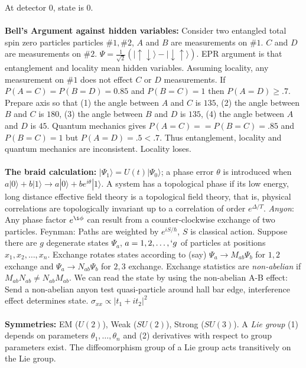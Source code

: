 At detector 0, state is $0$.
\\
\\
{\bf Bell's Argument against hidden variables:}
Consider two entangled total spin zero particles particles $\# 1, \#2$, 
$A$ and $B$ are measurements on $\#1$.
$C$ and $D$ are measurements on $\#2$.
$\Psi= {\frac 1 {\sqrt 2}} ( |\uparrow \downarrow\rangle - | \downarrow \uparrow\rangle )$.
EPR argument is that entanglement and locality mean hidden variables.  Assuming
locality, any measurement on $\#1$ does not effect $C$ or $D$ measurements.
If $P(A=C)=P(B=D)= 0.85$ and $P(B=C)=1$ then $P(A=D) \ge .7$.
Prepare axis so that 
(1) the angle between $A$ and $C$ is $135$,
(2) the angle between $B$ and $C$ is $180$,
(3) the angle between $B$ and $D$ is $135$,
(4) the angle between $A$ and $D$ is $45$.  Quantum mechanics gives
$P(A=C)= =P(B=C)= .85$ and $P(B=C)=1$ but $P(A=D)= .5 < .7$.  Thus entanglement, locality
and quantum mechanics are inconsistent.  Locality loses.
\\
\\
{\bf The braid calculation:}
$|\Psi_1 \rangle= U(t) |\Psi_0 \rangle$; a phase error $\theta$ is introduced when
$a |0 \rangle + b |1 \rangle \rightarrow a |0 \rangle + b e^{i \theta} |1 \rangle$.  
A system has a topological phase if its
low energy, long distance effective field theory is a topological field theory, 
that is, physical
correlations are topologically invariant up to a correlation of order $e^{\Delta/T}$.
\emph {Anyon}: Any phase factor $e^{\i \phi}$ can result from a counter-clockwise exchange
of two particles.  Feynman: Paths are weighted by $e^{i S/\hbar}$, $S$ is classical action.
Suppose there are $g$ degenerate states $\Psi_a$, $a= 1, 2, \ldots,`g$ of particles
at positions $x_1 , x_2 , \ldots , x_n$.  Exchange rotates states according to (say)
$\Psi_a \rightarrow M_{ab} \Psi_b$ for $1,2$ exchange and
$\Psi_a \rightarrow N_{ab} \Psi_b$ for $2,3$ exchange.  Exchange statistics are
\emph {non-abelian} if $M_{ab} N_{ab} \ne N_{ab} M_{ab}$.  We can read the state by using the
non-abelian A-B effect:  Send a non-abelian anyon test quasi-particle around hall bar
edge, interference effect determines state.  $\sigma_{xx} \varpropto |t_1 + i t_2|^2$
\\
\\
{\bf Symmetries:} EM ($U(2)$), Weak ($SU(2)$), Strong ($SU(3)$). A \emph{Lie group} 
(1) depends on parameters $\theta_1, \ldots, \theta_n$ and 
(2) derivatives with respect to group parameters
exist. The diffeomorphism group of a Lie group acts transitively on the Lie group.
